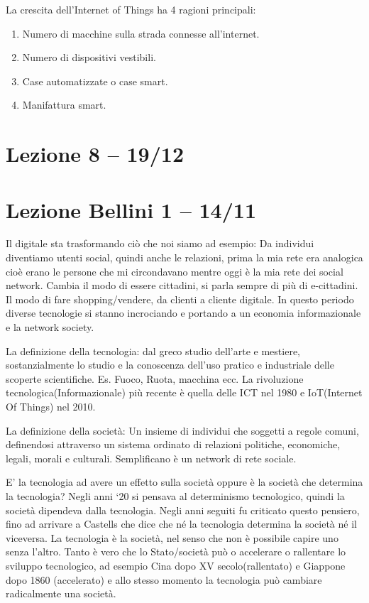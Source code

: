 \documentclass[a4page, 11pt]{article}
\begin{document}
La crescita dell'Internet of Things ha 4 ragioni principali:

\begin{enumerate}
	\def\labelenumi{\arabic{enumi}.}
	 
	\item
	Numero di macchine sulla strada connesse all'internet.
	\item
	Numero di dispositivi vestibili.
	\item
	Case automatizzate o case smart.
	\item
	Manifattura smart.
\end{enumerate}
\section*{Lezione 8 -- 19/12}
\section*{Lezione Bellini 1 -- 14/11}

Il digitale sta trasformando ciò che noi siamo ad esempio: Da individui
diventiamo utenti social, quindi anche le relazioni, prima la mia rete
era analogica cioè erano le persone che mi circondavano mentre oggi è la
mia rete dei social network. Cambia il modo di essere cittadini, si
parla sempre di più di e-cittadini. Il modo di fare shopping/vendere, da
clienti a cliente digitale. In questo periodo diverse tecnologie si
stanno incrociando e portando a un economia informazionale e la network
society.

La definizione della tecnologia: dal greco studio dell'arte e mestiere,
sostanzialmente lo studio e la conoscenza dell'uso pratico e industriale
delle scoperte scientifiche. Es. Fuoco, Ruota, macchina ecc. La
rivoluzione tecnologica(Informazionale) più recente è quella delle ICT
nel 1980 e IoT(Internet Of Things) nel 2010.

La definizione della società: Un insieme di individui che soggetti a
regole comuni, definendosi attraverso un sistema ordinato di relazioni
politiche, economiche, legali, morali e culturali. Semplificano è un
network di rete sociale.

E' la tecnologia ad avere un effetto sulla società oppure è la società
che determina la tecnologia? Negli anni `20 si pensava al determinismo
tecnologico, quindi la società dipendeva dalla tecnologia. Negli anni
seguiti fu criticato questo pensiero, fino ad arrivare a Castells che
dice che né la tecnologia determina la società né il viceversa. La
tecnologia è la società, nel senso che non è possibile capire uno senza
l'altro. Tanto è vero che lo Stato/società può o accelerare o rallentare
lo sviluppo tecnologico, ad esempio Cina dopo XV secolo(rallentato) e
Giappone dopo 1860 (accelerato) e allo stesso momento la tecnologia può
cambiare radicalmente una società.
\end{document}
